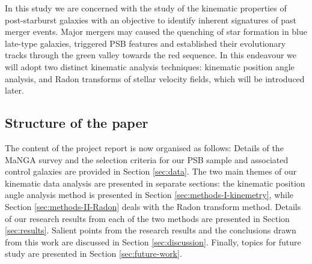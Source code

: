 In this study we are concerned with the study of the kinematic properties of post-starburst galaxies with an objective to identify inherent signatures of past merger events. Major mergers may caused the quenching of star formation in blue late-type galaxies, triggered PSB features and established their evolutionary tracks through the green valley towards the red sequence. In this endeavour we will adopt two distinct kinematic analysis techniques: kinematic position angle analysis, and Radon transforms of stellar velocity fields, which will be introduced later.

\subsection{Structure of the paper}
The content of the project report is now organised as follows: Details of the MaNGA survey and the selection criteria for our PSB sample and associated control galaxies are provided in Section \ref{sec:data}. The two main themes of our kinematic data analysis are presented in separate sections: the kinematic position angle  analysis method is presented in Section \ref{sec:methods-I-kinemetry}, while Section \ref{sec:methods-II-Radon} deals with the Radon transform method. Details of our research results from each of the two methods are presented in Section \ref{sec:results}. Salient points from the research results and the conclusions drawn from this work are discussed in Section \ref{sec:discussion}. Finally, topics for future study are presented in Section \ref{sec:future-work}.
